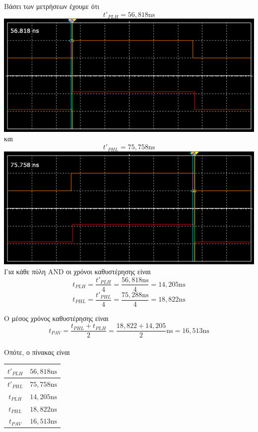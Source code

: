 \documentclass{article}
\begin{document}
Βάσει των μετρήσεων έχουμε ότι \\
\[t'_{PLH} = \si{56,818\ns}\]
\includegraphics[width=\textwidth]{./res/tplh.png}
και
\[t'_{PHL} = \si{75,758\ns}\]
\includegraphics[width=\textwidth]{./res/tphl.png} \\

Για κάθε πύλη AND οι χρόνοι καθυστέρησης είναι \\
\[t_{PLH} = \frac{t'_{PLH}}{4} = \frac{\si{56,818\ns}}{4} = \si{14,205\ns}\]
\[t_{PHL} = \frac{t'_{PHL}}{4} = \frac{\si{75,288\ns}}{4} = \si{18,822\ns}\]

Ο μέσος χρόνος καθυστέρησης είναι \\
\[t_{PAV} = \frac{t_{PHL} + t_{PLH}}{2} = \si{\frac{18,822 + 14,205}{2}\ns} =
\si{16,513\ns}\] \\

Οπότε, ο πίνακας είναι
\begin{center}
\begin{tabular}{|c|c|}
	\hline
	$t'_{PLH}$ & $\si{56,818\ns}$ \\
	\hline
	$t'_{PHL}$ & $\si{75,758\ns}$ \\
	\hline
	$t_{PLH}$ & $\si{14,205\ns}$ \\
	\hline
	$t_{PHL}$ & $\si{18,822\ns}$ \\
	\hline
	$t_{PAV}$ & $\si{16,513\ns}$ \\
	\hline
\end{tabular}
\end{center}

\renewcommand\refname{Πηγές}
\printbibliography
\end{document}
